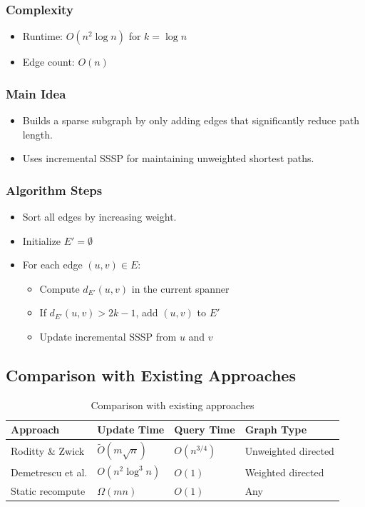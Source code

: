 \documentclass{report}
\begin{document}
\subsubsection*{Complexity}
\begin{itemize}
    \item Runtime: \( O(n^2 \log n) \) for \( k = \log n \)
    \item Edge count: \( O(n) \)
\end{itemize}

\subsubsection*{Main Idea}
\begin{itemize}
    \item Builds a sparse subgraph by only adding edges that significantly reduce path length.
    \item Uses incremental SSSP for maintaining unweighted shortest paths.
\end{itemize}

\subsubsection*{Algorithm Steps}
\begin{itemize}
    \item Sort all edges by increasing weight.
    \item Initialize \( E' = \emptyset \)
    \item For each edge \( (u, v) \in E \):
    \begin{itemize}
        \item Compute \( d_{E'}(u, v) \) in the current spanner
        \item If \( d_{E'}(u, v) > 2k - 1 \), add \( (u, v) \) to \( E' \)
        \item Update incremental SSSP from \( u \) and \( v \)
    \end{itemize}
\end{itemize}
\subsection*{Comparison with Existing Approaches}
\begin{table}[h]
\centering
\begin{tabular}{|l|l|l|l|}
\hline
\textbf{Approach} & \textbf{Update Time} & \textbf{Query Time} & \textbf{Graph Type} \\ \hline
Roditty \& Zwick & $\tilde{O}(m \sqrt{n})$ & $O(n^{3/4})$ & Unweighted directed \\ \hline
Demetrescu et al. & $O(n^2 \log^3 n)$ & $O(1)$ & Weighted directed \\ \hline
Static recompute & $\Omega(mn)$ & $O(1)$ & Any \\ \hline
\end{tabular}
\caption{Comparison with existing approaches}
\end{table}
\end{document}
